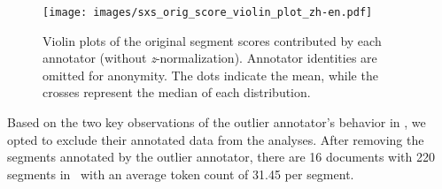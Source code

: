 \begin{figure*}
    \centering
    \texttt{[image: images/sxs\_orig\_score\_violin\_plot\_zh-en.pdf]}
    \caption{
    Violin plots of the original segment scores contributed by each annotator (without \textit{z}-normalization). Annotator identities are omitted for anonymity. The dots indicate the mean, while the crosses represent the median of each distribution.
    }
    \label{fig:violin}
\end{figure*}

Based on the two key observations of the outlier annotator's behavior in \sxsmqm, we opted to exclude their annotated data from the analyses. After removing the segments annotated by the outlier annotator, there are 16 documents with 220 segments in \ZhEn~with an average token count of 31.45 per segment.